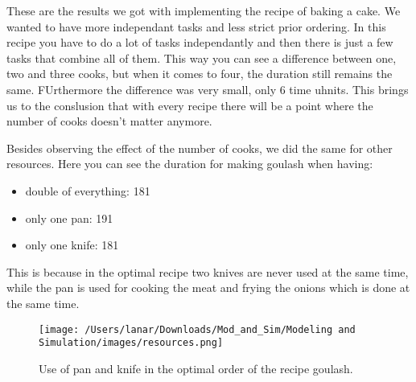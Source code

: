 These are the results we got with implementing the recipe of baking a cake. We wanted to have more independant tasks and less strict prior ordering. 
In this recipe you have to do a lot of tasks independantly and then there is just a few tasks that combine all of them. This way you can see a difference 
between one, two and three cooks, but when it comes to four, the duration still remains the same. FUrthermore the difference was very small, only 6 time uhnits. This brings us to the conslusion that with every recipe 
there will be a point where the number of cooks doesn't matter anymore. 

Besides observing the effect of the number of cooks, we did the same for other resources. Here you can see the duration for making goulash when having:
\begin{itemize}
    \item double of everything: 181
    \item only one pan: 191
    \item only one knife: 181
\end{itemize}

This is because in the optimal recipe two knives are never used at the same time, while the pan is used for cooking the meat and frying the onions which is done at the same time. 

\begin{figure}[H]
    \centerline{\texttt{[image: /Users/lanar/Downloads/Mod\_and\_Sim/Modeling and Simulation/images/resources.png]}}
    \caption{Use of pan and knife in the optimal order of the recipe goulash.}
    \label{fig9}
\end{figure}
